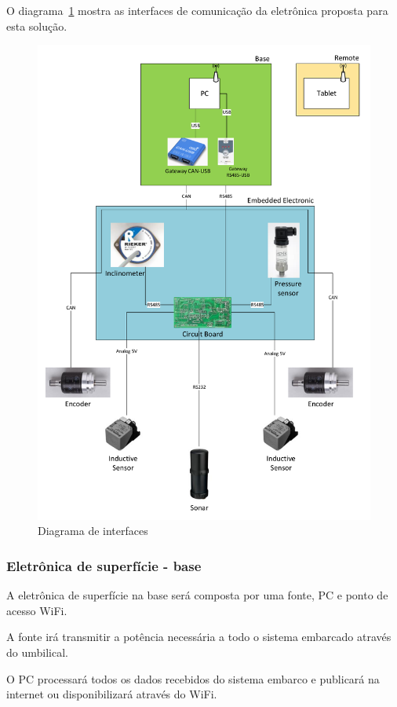 O diagrama~\ref{EE_1} mostra as interfaces de comunicação da eletrônica proposta
para esta solução.

\begin{figure}[H]
    \centering
    \includegraphics[width=1\columnwidth]{figs/EE/1.pdf}
    \caption{Diagrama de interfaces}
    \label{EE_1}
\end{figure}

\subsubsection{Eletrônica de superfície - base}
A eletrônica de superfície na base será composta por uma fonte, PC e ponto de
acesso WiFi.

A fonte irá transmitir a potência necessária a todo o sistema embarcado
através do umbilical.

O PC processará todos os dados recebidos do sistema embarco e publicará na
internet ou disponibilizará através do WiFi.


